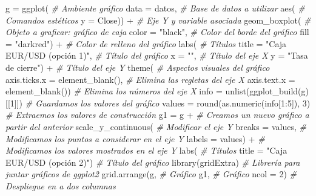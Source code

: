 \documentclass[
]{book}
\newenvironment{Shaded}{\begin{snugshade}}{\end{snugshade}}
\newcommand{\AttributeTok}[1]{\textcolor[rgb]{0.77,0.63,0.00}{#1}}
\newcommand{\CommentTok}[1]{\textcolor[rgb]{0.56,0.35,0.01}{\textit{#1}}}
\newcommand{\DecValTok}[1]{\textcolor[rgb]{0.00,0.00,0.81}{#1}}
\newcommand{\FunctionTok}[1]{\textcolor[rgb]{0.00,0.00,0.00}{#1}}
\newcommand{\NormalTok}[1]{#1}
\newcommand{\OtherTok}[1]{\textcolor[rgb]{0.56,0.35,0.01}{#1}}
\newcommand{\SpecialCharTok}[1]{\textcolor[rgb]{0.00,0.00,0.00}{#1}}
\newcommand{\StringTok}[1]{\textcolor[rgb]{0.31,0.60,0.02}{#1}}
\begin{document}
\begin{Shaded}
\begin{Highlighting}[]
\NormalTok{g }\OtherTok{=} \FunctionTok{ggplot}\NormalTok{( }\CommentTok{\# Ambiente gráfico}
  \AttributeTok{data =}\NormalTok{ datos, }\CommentTok{\# Base de datos a utilizar}
  \FunctionTok{aes}\NormalTok{( }\CommentTok{\# Comandos estéticos}
    \AttributeTok{y =}\NormalTok{ Close)) }\SpecialCharTok{+} \CommentTok{\# Eje Y y variable asociada}
  \FunctionTok{geom\_boxplot}\NormalTok{( }\CommentTok{\# Objeto a graficar: gráfico de caja}
    \AttributeTok{color =} \StringTok{"black"}\NormalTok{, }\CommentTok{\# Color del borde del gráfico}
    \AttributeTok{fill =} \StringTok{"darkred"}\NormalTok{) }\SpecialCharTok{+} \CommentTok{\# Color de relleno del gráfico}
  \FunctionTok{labs}\NormalTok{( }\CommentTok{\# Títulos }
    \AttributeTok{title =} \StringTok{"Caja EUR/USD (opción 1)"}\NormalTok{, }\CommentTok{\# Título del gráfico}
    \AttributeTok{x =} \StringTok{""}\NormalTok{, }\CommentTok{\# Título del eje X}
    \AttributeTok{y =} \StringTok{"Tasa de cierre"}\NormalTok{) }\SpecialCharTok{+} \CommentTok{\# Título del eje Y}
  \FunctionTok{theme}\NormalTok{( }\CommentTok{\# Aspectos visuales del gráfico}
    \AttributeTok{axis.ticks.x =} \FunctionTok{element\_blank}\NormalTok{(), }\CommentTok{\# Elimina las regletas del eje X}
    \AttributeTok{axis.text.x =} \FunctionTok{element\_blank}\NormalTok{()) }\CommentTok{\# Elimina los números del eje X}
\NormalTok{info }\OtherTok{=} \FunctionTok{unlist}\NormalTok{(}\FunctionTok{ggplot\_build}\NormalTok{(g)[[}\DecValTok{1}\NormalTok{]]) }\CommentTok{\# Guardamos los valores del gráfico}
\NormalTok{values }\OtherTok{=} \FunctionTok{round}\NormalTok{(}\FunctionTok{as.numeric}\NormalTok{(info[}\DecValTok{1}\SpecialCharTok{:}\DecValTok{5}\NormalTok{]), }\DecValTok{3}\NormalTok{) }\CommentTok{\# Extraemos los valores de construcción}
\NormalTok{g1 }\OtherTok{=}\NormalTok{ g }\SpecialCharTok{+} \CommentTok{\# Creamos un nuevo gráfico a partir del anterior}
  \FunctionTok{scale\_y\_continuous}\NormalTok{( }\CommentTok{\# Modificar el eje Y}
    \AttributeTok{breaks =}\NormalTok{ values, }\CommentTok{\# Modificamos los puntos a considerar en el eje Y}
    \AttributeTok{labels =}\NormalTok{ values) }\SpecialCharTok{+} \CommentTok{\# Modificamos los valores mostrados en el eje Y}
  \FunctionTok{labs}\NormalTok{( }\CommentTok{\# Títulos}
    \AttributeTok{title =} \StringTok{"Caja EUR/USD (opción 2)"}\NormalTok{) }\CommentTok{\# Título del gráfico}
\FunctionTok{library}\NormalTok{(gridExtra) }\CommentTok{\# Librería para juntar gráficos de ggplot2}
\FunctionTok{grid.arrange}\NormalTok{(g, }\CommentTok{\# Gráfico}
\NormalTok{             g1, }\CommentTok{\# Gráfico}
             \AttributeTok{ncol =} \DecValTok{2}\NormalTok{) }\CommentTok{\# Despliegue en a dos columnas }
\end{Highlighting}
\end{Shaded}
\end{document}
